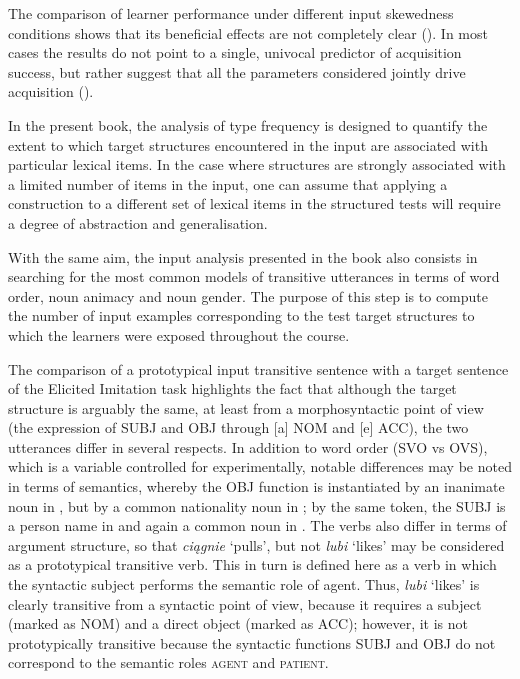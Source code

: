 The comparison of learner performance under different input skewedness conditions shows that its beneficial effects are not completely clear (\citealt{BorovskyElman2006, CasenhiserGoldberg2005}). In most cases the results do not point to a single, univocal predictor of acquisition success, but rather suggest that all the parameters considered jointly drive acquisition (\citealt{YearGordon2009, WulffEtAl2009}).

In the present book, the analysis of type frequency is designed to quantify the extent to which target structures encountered in the input are associated with particular lexical items. In the case where structures are strongly associated with a limited number of items in the input, one can assume that applying a construction to a different set of lexical items in the structured tests will require a degree of abstraction and generalisation. 

With the same aim, the input analysis presented in the book also consists in searching for the most common models of transitive utterances in terms of word order, noun animacy and noun gender. The purpose of this step is to compute the number of input examples corresponding to the test target structures to which the learners were exposed throughout the course. 

The comparison of a prototypical input transitive sentence  with a target sentence of the Elicited Imitation task  highlights the fact that although the target structure is arguably the same, at least from a morphosyntactic point of view (the expression of SUBJ and OBJ through [a] NOM and [e] ACC), the two utterances differ in several respects. In addition to word order (SVO vs OVS), which is a variable controlled for experimentally, notable differences may be noted in terms of semantics, whereby the OBJ function is instantiated by an inanimate noun in , but by a common nationality noun in ; by the same token, the SUBJ is a person name in  and again a common noun in . The verbs also differ in terms of argument structure, so that \textit{ciągnie} ‘pulls’, but not \textit{lubi} ‘likes’ may be considered as a prototypical transitive verb. This in turn is defined here as a verb in which the syntactic subject performs the semantic role of agent. Thus, \textit{lubi} ‘likes’ is clearly transitive from a syntactic point of view, because it requires a subject (marked as NOM) and a direct object (marked as ACC); however, it is not prototypically transitive because the syntactic functions SUBJ and OBJ do not correspond to the semantic roles \textsc{agent} and \textsc{patient}.

